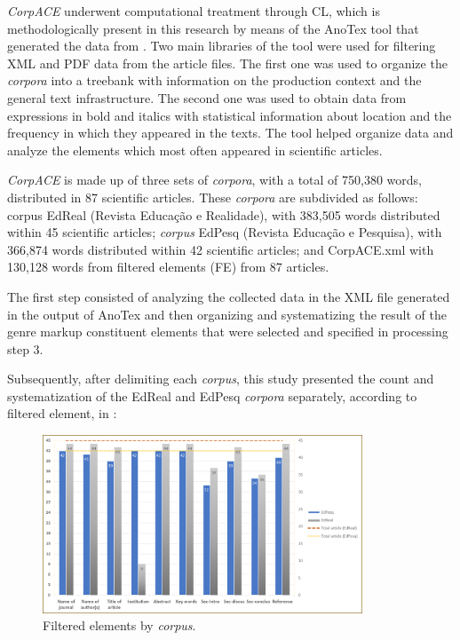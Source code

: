 \documentclass[english]{textolivre}
\begin{document}
\textit{CorpACE} underwent computational treatment through CL, which is methodologically present in this research by means of the AnoTex tool that generated the data from . Two main libraries of the tool were used for filtering XML and PDF data from the article files. The first one was used to organize the \textit{corpora} into a treebank with information on the production context and the general text infrastructure. The second one was used to obtain data from expressions in bold and italics with statistical information about location and the frequency in which they appeared in the texts. The tool helped organize data and analyze the elements which most often appeared in scientific articles.

\textit{CorpACE} is made up of three sets of \textit{corpora}, with a total of 750,380 words, distributed in 87 scientific articles. These \textit{corpora} are subdivided as follows: corpus EdReal (Revista Educação e Realidade), with 383,505 words distributed within 45 scientific articles; \textit{corpus} EdPesq (Revista Educação e Pesquisa), with 366,874 words distributed within 42 scientific articles; and CorpACE.xml with 130,128 words from filtered elements (FE) from 87 articles.

The first step consisted of analyzing the collected data in the XML file generated in the output of AnoTex and then organizing and systematizing the result of the genre markup constituent elements that were selected and specified in processing step 3.

Subsequently, after delimiting each \textit{corpus}, this study presented the count and systematization of the EdReal and EdPesq \textit{corpora} separately, according to filtered element, in :

\begin{figure}[htbp]
 \centering
 \includegraphics[width=0.85\textwidth]{Fig6.png}
 \caption{Filtered elements by \textit{corpus}.}
 \label{fig-06}
\end{figure}
\end{document}
